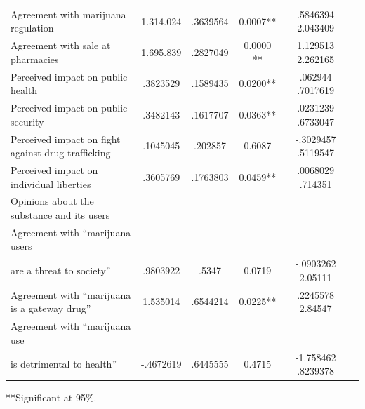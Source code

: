 \documentclass[11pt]{article}
\begin{document}
\begin{table}
\begin{small}
\begin{tabular}{lccccc}
Agreement with marijuana regulation 	&	1.314.024	&	.3639564	&	0.0007**	&	.5846394    2.043409	\\
Agreement with sale at pharmacies	&	1.695.839	&	.2827049	&	0.0000 **	&	 1.129513    2.262165	\\
Perceived impact on public health 	&	.3823529 	&	.1589435 	&	0.0200**	&	.062944    .7017619	\\
Perceived impact on public security 	&	.3482143	&	.1617707	&	0.0363**	&	.0231239    .6733047	\\
Perceived impact on fight against drug-trafficking	&	.1045045	&	.202857	&	0.6087	&	-.3029457    .5119547	\\
Perceived impact on individual liberties	&	.3605769	&	.1763803	&	 0.0459**	&	 .0068029     .714351	\\\hline
Opinions about the substance and its users	&		&		&		&		\\ \hline
Agreement with ``marijuana users	&		&		&		&		\\
are a threat to society''	&	.9803922	&	 .5347	&	0.0719	&	-.0903262     2.05111	\\
Agreement with ``marijuana is a gateway drug''	&	1.535014	&	.6544214	&	0.0225** 	&	.2245578     2.84547	\\
Agreement with ``marijuana use 	&		&		&		&			\\
is detrimental to health''	&	-.4672619	&	.6445555	&	0.4715	&	-1.758462    .8239378	\\	\hline
\end{tabular}
**Significant at 95\%.
\end{small}
\end{table}
\end{document}
